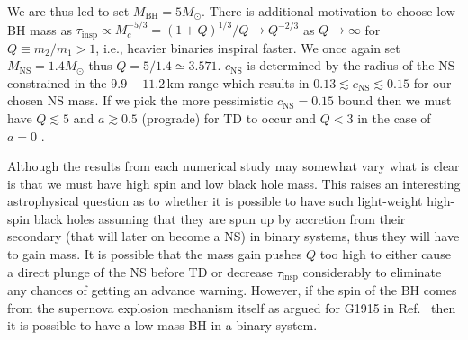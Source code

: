 \documentclass[prd,amsmath,amssymb,aps,floats,amsfonts,notitlepage,superscriptaddress,eqsecnum,nofootinbib,10pt]{revtex4-1}
\begin{document}
%
We are thus led to set $M_\text{BH} =5 M_\odot$. There is additional motivation to choose low BH mass as 
 $\tau_\text{insp} \propto M_c^{-5/3} = (1+Q)^{1/3}/Q\to Q^{-2/3}$ as $Q\to\infty$ for $Q\equiv m_2/m_1 > 1$, i.e., heavier binaries inspiral faster.
 We once again set $M_\text{NS}=1.4 M_\odot$ thus $Q=5/1.4  \simeq 3.571$. $c_\text{NS}$ is determined by the radius of the NS constrained in the $9.9 - 11.2\,$km range \cite{Ozel:2016oaf}
 which results in $0.13\lesssim c_\text{NS} \lesssim 0.15$ 
 for our chosen NS mass.
If we pick the more pessimistic $c_\text{NS} = 0.15$ bound then we must have $Q\lesssim 5$ and $a\gtrsim 0.5$ (prograde) for TD to occur \cite{Ferrari:2008nr}
and $Q< 3$ in the case of $a=0$ \cite{Kyutoku:2011vz}.

Although the results from each numerical study may somewhat vary what is clear is that we must have high spin and low black hole mass.
This raises an interesting astrophysical question as to whether it is possible to have such light-weight high-spin black holes assuming that
they are spun up by accretion from their secondary (that will later on become a NS) in binary systems, thus they will have to gain mass.
It is possible that the mass gain pushes $Q$ too high to either cause a direct plunge of the NS before TD or decrease $\tau_\text{insp}$ considerably
to eliminate any chances of getting an advance warning.
However, if the spin of the BH comes from the supernova explosion mechanism itself as argued for G1915 in Ref.~\cite{McClintock:2006xd} then it is possible to have a 
low-mass BH in a binary system.
\end{document}
